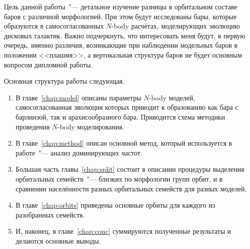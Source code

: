 \documentclass{trlnotes}
\begin{document}
Цель данной работы~"--- детальное изучение разницы в орбитальном составе баров с  различной морфологией. При этом будут исследованы бары, которые образуются в самосогласованных $N$-body расчётах, моделирующих эволюцию дисковых галактик. Важно подчеркнуть, что интересовать меня будут, в первую очередь, именно различия, возникающие при наблюдении модельных баров в положении <<плашмя>>, а вертикальная структура баров не будет основным вопросом дипломной работы. 

Основная структура работы следующая.

\begin{enumerate}
\item В главе~\ref{chap:model} описаны параметры $N$-body моделей, самосогласованная эволюция которых приводит к образованию как бара с барлинзой, так и
арахисообразного бара. Приводится схема методики проведения $N$-body моделирования.
\item В главе~\ref{chap:method} описан основной метод, который используется в работе~"--- анализ 
доминирующих частот.
\item Большая часть главы~\ref{chap:split} состоит в описании процедуры выделения орбитальных семейств~"---
близких по морфологии групп орбит, и в сравнении населённости разных орбитальных семейств для разных моделей. 
\item В главе~\ref{chap:orbits} приведены основные орбиты для каждого из разобранных семейств.
\item И, наконец, в главе~\ref{chap:conc} суммируются полученные результаты и делаются основные выводы.
\end{enumerate}
\end{document}
